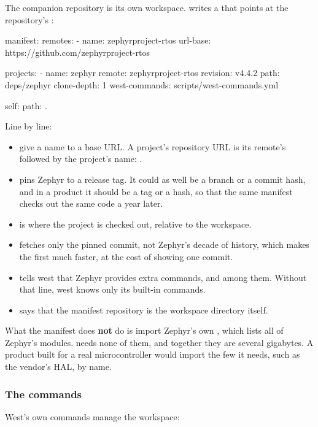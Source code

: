 The companion repository is its own workspace.  writes a  that
points at the repository’s :

\begin{yamlcode}
manifest:
  remotes:
    - name: zephyrproject-rtos
      url-base: https://github.com/zephyrproject-rtos

  projects:
    - name: zephyr
      remote: zephyrproject-rtos
      revision: v4.4.2
      path: deps/zephyr
      clone-depth: 1
      west-commands: scripts/west-commands.yml

  self:
    path: .
\end{yamlcode}

\noindent Line by line:

\begin{itemize}
  \item \textbf{} give a name to a base URL. A project’s repository URL is its remote’s
     followed by the project’s name: .
  \item \textbf{} pins Zephyr to a release tag. It could as well be a branch or a
    commit hash, and in a product it should be a tag or a hash, so that the same manifest checks out the
    same code a year later.
  \item \textbf{} is where the project is checked out, relative to the workspace.
  \item \textbf{} fetches only the pinned commit, not Zephyr’s decade of history, which
    makes the first  much faster, at the cost of  showing one commit.
  \item \textbf{} tells west that Zephyr provides extra commands,  and
     among them. Without that line, west knows only its built-in commands.
  \item \textbf{} says that the manifest repository is the workspace directory itself.
\end{itemize}

What the manifest does \textbf{not} do is import Zephyr’s own , which lists all of
Zephyr’s modules.  needs none of them, and together they are several gigabytes. A
product built for a real microcontroller would import the few it needs, such as the vendor’s HAL, by
name.

\subsubsection{The commands}
West’s own commands manage the workspace:

